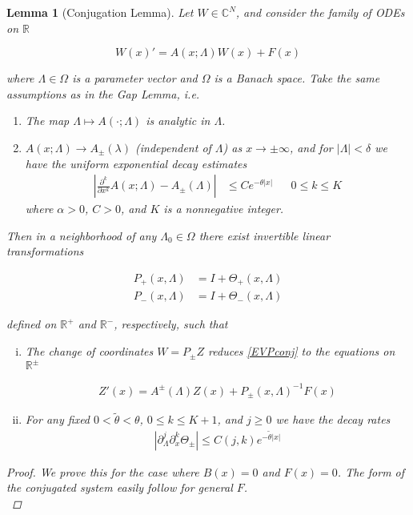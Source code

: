\documentclass[12pt]{article}
\def\R{{\mathbb R}}
\def\C{{\mathbb C}}
\newtheorem{lemma}{Lemma}
\begin{document}
\begin{lemma}[Conjugation Lemma]
Let $W \in \C^N$, and consider the family of ODEs on $\R$

\begin{equation}\label{EVPconj}
W(x)' = A(x; \Lambda) W(x) + F(x) 
\end{equation}

where $\Lambda \in \Omega$ is a parameter vector and $\Omega$ is a Banach space. Take the same assumptions as in the Gap Lemma, i.e. 

\begin{enumerate}
	\item The map $\Lambda \mapsto A(\cdot; \Lambda)$ is analytic in $\Lambda$.
	\item $A(x; \Lambda) \rightarrow A_\pm(\lambda)$ (independent of $\Lambda$) as $x \rightarrow \pm \infty$, and for $|\Lambda| < \delta$ we have the uniform exponential decay estimates 
	\begin{align}
	\left| \frac{\partial^k}{\partial x^k} A(x; \Lambda) - A_\pm(\Lambda) \right| 
	&\leq C e^{-\theta |x|} && 0 \leq k \leq K
	\end{align}
	where $\alpha > 0$, $C > 0$, and $K$ is a nonnegative integer.
\end{enumerate}

Then in a neighborhood of any $\Lambda_0 \in \Omega$ there exist invertible linear transformations

\begin{align*}
P_+(x, \Lambda) &= I + \Theta_+(x, \Lambda) \\
P_-(x, \Lambda) &= I + \Theta_-(x, \Lambda) 
\end{align*}

defined on $\R^+$ and $\R^-$, respectively, such that

\begin{enumerate}[(i)]
\item The change of coordinates $W = P_\pm Z$ reduces \eqref{EVPconj} to the equations on $\R^\pm$

\begin{align}\label{conjZ}
Z'(x) = A^\pm(\Lambda) Z(x) + P_\pm(x, \Lambda)^{-1} F(x)
\end{align}

\item For any fixed $0 < \tilde{\theta} < \theta$, $0 \leq k \leq K+1$, and $j \geq 0$ we have the decay rates
\begin{align*}
\left| \partial_\Lambda^j \partial_x^k \Theta_\pm \right| \leq C(j, k)e^{-\tilde{\theta}|x|}
\end{align*}
\end{enumerate}
\begin{proof}
We prove this for the case where $B(x) = 0$ and $F(x) = 0$. The form of the conjugated system easily follow for general $F$.\\


\end{proof}
\end{lemma}
\end{document}
